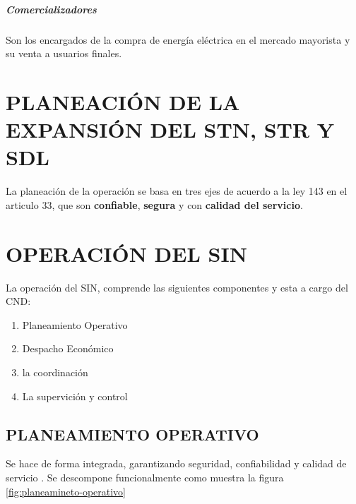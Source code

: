 \documentclass[a5paper]{book}%
\begin{document}
\paragraph{Comercializadores}

Son los encargados de la compra de energía eléctrica en el mercado mayorista y su venta a usuarios finales.

\chapter{PLANEACIÓN DE LA EXPANSIÓN DEL STN, STR Y SDL }

La planeación de la operación se basa en tres ejes de acuerdo a la ley 143 \cite{LEY143} en el articulo 33, que son \textbf{confiable}, \textbf{segura} y con \textbf{calidad del servicio}.\\

\chapter{OPERACIÓN DEL SIN}

La operación del \ac{SIN}, comprende las siguientes componentes y esta a cargo del \ac{CND}:

\begin{enumerate}
	\item Planeamiento Operativo
	\item Despacho Económico
	\item la coordinación
	\item La supervición y control
\end{enumerate}

\section{PLANEAMIENTO OPERATIVO}

Se hace de forma integrada, garantizando seguridad, confiabilidad y
calidad de servicio \cite{CREG0251995}. Se descompone funcionalmente
como muestra la figura \ref{fig:planeamineto-operativo}\\\\
\end{document}
